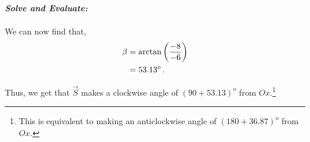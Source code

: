 \begin{subquestions}
\begin{subsubquestions}
\textbf{\textit{Solve and Evaluate:}} \\ \\
We can now find that,
\begin{align}
	\beta & = \arctan\left(\frac{-8}{-6}\right) \nonumber \\
	      & = 53.13^o \,.
\end{align}

Thus, we get that $\vec{S}$ makes a clockwise angle of $(90+53.13)^o$ from $Ox$.\footnote{This is equivalent to making an anticlockwise angle of $(180+36.87)^o$ from $Ox$.}



\end{subsubquestions}




\end{subquestions}